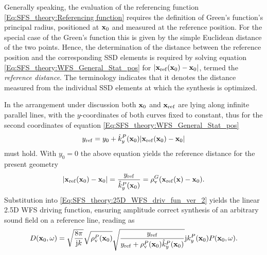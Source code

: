Generally speaking, the evaluation of the referencing function \eqref{Eq:SFS_theory:Referencing function} requires the definition of Green's function's principal radius, positioned at $\mathbf{x}_0$ and measured at the reference position.
For the special case of the Green's function this is given by the simple Euclidean distance of the two points.
Hence, the determination of the distance between the reference position and the corresponding SSD elements is required by solving equation \eqref{Eq:SFS_theory:WFS_General_Stat_pos} for $|\mathbf{x}_{\mathrm{ref}}(\mathbf{x}_0)-\mathbf{x}_0|$, termed the \emph{reference distance}.
The terminology indicates that it denotes the distance measured from the individual SSD elements at which the synthesis is optimized.

In the arrangement under discussion both $\mathbf{x}_0$ and $\mathbf{x}_{\mathrm{ref}}$ are lying along infinite parallel lines, with the $y$-coordinates of both curves fixed to constant, thus for the second coordinates of equation \eqref{Eq:SFS_theory:WFS_General_Stat_pos}
\begin{equation}
y_{\mathrm{ref}} = y_0 + \hat{k}_y^P(\mathbf{x}_0) |\mathbf{x}_{\mathrm{ref}}(\mathbf{x}_0)-\mathbf{x}_0|
\end{equation}
must hold.
With $y_0=0$ the above equation yields the reference distance for the present geometry
\begin{equation}
|\mathbf{x}_{\mathrm{ref}}(\mathbf{x}_0)-\mathbf{x}_0| = \frac{y_{\mathrm{ref}}}{\hat{k}_y^P(\mathbf{x}_0)} = \rho_\mathrm{v}^G(\mathbf{x}_{\mathrm{ref}}(\mathbf{x})-\mathbf{x}_0). 
\end{equation}
Substitution into \eqref{Eq:SFS_theory:25D_WFS_driv_fun_ver_2} yields the linear 2.5D WFS driving function, ensuring amplitude correct synthesis of an arbitrary sound field on a reference line, reading as
\begin{equation}
D(\mathbf{x}_0, \omega) = 
\sqrt{\frac{8\pi}{\mathrm{j} k}}\sqrt{\rho_\mathrm{v}^P(\mathbf{x}_0)}\sqrt{ \frac{y_{\mathrm{ref}}}{y_{\mathrm{ref}} + \rho_\mathrm{v}^P(\mathbf{x}_0) \hat{k}_y^P(\mathbf{x}_0)}}
\mathrm{j} k_y^P(\mathbf{x}_0) P(\mathbf{x}_0,\omega).
\end{equation}

